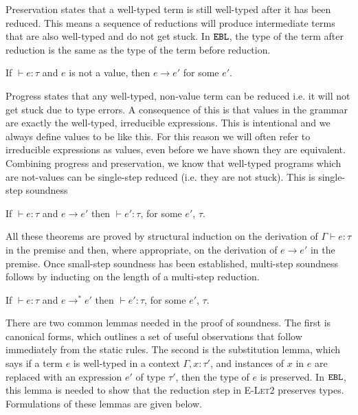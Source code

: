 Preservation states that a well-typed term is still well-typed after it has been reduced. This means a sequence of reductions will produce intermediate terms that are also well-typed and do not get stuck. In $\mathtt{EBL}$, the type of the term after reduction is the same as the type of the term before reduction.

\begin{theorem}
If $\vdash e: \tau$ and $e$ is not a value, then $e \longrightarrow e'$ for some $e'$.
\end{theorem}

Progress states that any well-typed, non-value term can be reduced i.e. it will not get stuck due to type errors. A consequence of this is that values in the grammar are exactly the well-typed, irreducible expressions. This is intentional and we always define values to be like this. For this reason we will often refer to irreducible expressions as values, even before we have shown they are equivalent. Combining progress and preservation, we know that well-typed programs which are not-values can be single-step reduced (i.e. they are not stuck). This is single-step soundness

\begin{theorem}
If $\vdash e: \tau$ and $e \longrightarrow e'$ then $\vdash e': \tau$, for some $e'$, $\tau$.
\end{theorem}

All these theorems are proved by structural induction on the derivation of $\Gamma \vdash e: \tau$ in the premise and then, where appropriate, on the derivation of $e \longrightarrow e'$ in the premise. Once small-step soundness has been established, multi-step soundness follows by inducting on the length of a multi-step reduction.

\begin{theorem}
If $\vdash e: \tau$ and $e \longrightarrow^{*} e'$ then $\vdash e': \tau$, for some $e'$, $\tau$.
\end{theorem}

There are two common lemmas needed in the proof of soundness. The first is canonical forms, which outlines a set of useful observations that follow immediately from the static rules. The second is the substitution lemma, which says if a term $e$ is well-typed in a context $\Gamma, x: \tau'$, and instances of $x$ in $e$ are replaced with an expression $e'$ of type $\tau'$, then the type of $e$ is preserved. In $\mathtt{EBL}$, this lemma is needed to show that the reduction step in \textsc{E-Let2} preserves types. Formulations of these lemmas are given below.

